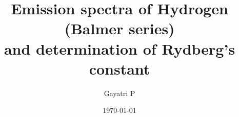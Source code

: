 \documentclass[reprint,amsmath,amssymb,aps, margin=1in]{revtex4-2}
\begin{document}
    \title{Emission spectra of Hydrogen (Balmer series)\\and
    determination of Rydberg's constant}

    \author{Gayatri P}
    \date{\today}

    
    \maketitle

    
    
    
    
    

    
    \nocite{*}
\end{document}
